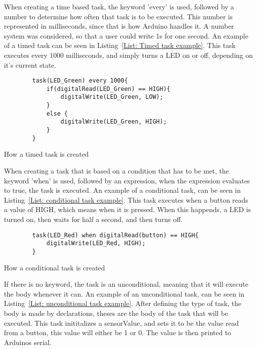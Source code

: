 When creating a time based task, the keyword 'every' is used, followed by a number to determine how often that task is to be executed. This number is represented in milliseconds, since that is how Arduino handles it. A number system was considered, so that a user could write 1s for one second.
An example of a timed task can be seen in Listing~\ref{List: Timed task example}. This task executes every 1000 milliseconds, and simply turns a LED on or off, depending on it's current state.


\begin{listing}[htb!]
    \begin{verbatim}
        task(LED_Green) every 1000{
            if(digitalRead(LED_Green) == HIGH){
                digitalWrite(LED_Green, LOW);
            }
            else {
                digitalWrite(LED_Green, HIGH);
            }
        }
    \end{verbatim}
    \caption{How a timed task is created}
    \label{List: Timed task example}
\end{listing}


When creating a task that is based on a condition that has to be met, the keyword 'when' is used, followed by an expression, when the expression evaluates to true, the task is executed. An example of a conditional task, can be seen in Listing~\ref{List: conditional task example}. This task executes when a button reads a value of HIGH, which means when it is pressed. When this happends, a LED is turned on, then waits for half a second, and then turns off.


\begin{listing}[htb!]
    \begin{verbatim}
        task(LED_Red) when digitalRead(button) == HIGH{
            digitalWrite(LED_Red, HIGH);
        }
    \end{verbatim}
    \caption{How a conditional task is created}
    \label{List: conditional task example}
\end{listing}


If there is no keyword, the task is an unconditional, meaning that it will execute the body whenever it can. An example of an unconditional task, can be seen in Listing~\ref{List: unconditional task example}. After defining the type of task, the body is made by declarations, theses are the body of the task that will be executed. This task inititalizes a sensorValue, and sets it to be the value read from a button, this value will either be 1 or 0. The value is then printed to Arduinos serial.


